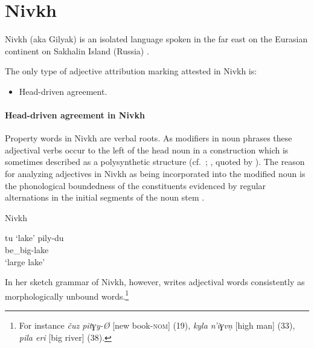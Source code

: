 \section{Nivkh}
Nivkh (aka Gilyak) is an isolated language spoken in the far east on the Eurasian continent on Sakhalin Island (Russia) \citep[222–223]{salminen2007}.

The only type of adjective attribution marking attested in Nivkh is:
\begin{itemize}
\item Head-driven agreement.
\end{itemize}

\paragraph{Head-driven agreement in Nivkh}
Property words in Nivkh are verbal roots. As modifiers in noun phrases these adjectival verbs occur to the left of the head noun in a construction which is sometimes described as a polysynthetic structure (cf.~\citealt[16]{gruzdeva1998}; \citealt[80]{jakobson1971}, quoted by \citealt[138]{rijkhoff2002}). The reason for analyzing adjectives in Nivkh as being incorporated into the modified noun is the phonological boundedness of the constituents evidenced by regular alternations in the initial segments of the noun stem \cite[16]{gruzdeva1998}.
\begin{exe}
\ex \rm{Nivkh \citep[16]{gruzdeva1998}}
\begin{xlist}
\ex tu ‘lake’
\ex 
\gll	pily-du\\
	be\_big-lake\\
\glt	‘large lake’
\end{xlist}
\end{exe}
In her sketch grammar of Nivkh, however, \cite{gruzdeva1998} writes adjectival words consistently as morphologically unbound words.\footnote{For instance \textit{čuz pitɣy-Ø} [new book-\textsc{nom}] (19), \textit{kyla n'iɣvn̦} [high man] (33), \textit{pila eri} [big river] (38).}

